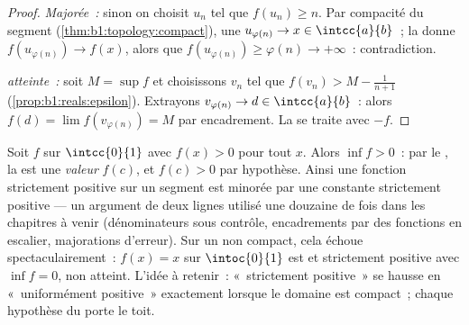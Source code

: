 \begin{proof}
\emph{Majorée~:} sinon on choisit $u_n$ tel que $f(u_n) \geq n$. Par
compacité du segment (\cref{thm:b1:topology:compact}), une  $u_{\varphi(n)} \to x \in \intcc{a}{b}$~; la  donne
$f(u_{\varphi(n)}) \to f(x)$, alors que $f(u_{\varphi(n)}) \geq
\varphi(n) \to +\infty$~: contradiction.

\emph{ atteinte~:} soit $M = \sup f$ et choisissons
$v_n$ tel que $f(v_n) > M - \frac{1}{n+1}$
(\cref{prop:b1:reals:epsilon}). Extrayons $v_{\varphi(n)} \to d \in
\intcc{a}{b}$~: alors $f(d) = \lim f(v_{\varphi(n)}) = M$ par
encadrement. La  se traite avec $-f$.
\end{proof}

\begin{example}\label{ex:b1:continuity:posmin}
Soit $f$  sur $\intcc{0}{1}$ avec $f(x) > 0$ pour tout
$x$. Alors $\inf f > 0$~: par le ,
la  est une \emph{valeur} $f(c)$, et $f(c) > 0$
par hypothèse. Ainsi une fonction  strictement positive
sur un segment est minorée par une constante strictement
positive --- un argument de deux lignes utilisé une douzaine de
fois dans les chapitres à venir (dénominateurs sous contrôle,
encadrements par des fonctions en escalier, majorations
d'erreur). Sur un  non compact, cela échoue
spectaculairement~: $f(x) = x$ sur $\intoc{0}{1}$ est  et
strictement positive avec $\inf f = 0$, non atteint. L'idée à
retenir~: «~strictement positive~» se hausse en «~uniformément
positive~» exactement lorsque le domaine est compact~; chaque
hypothèse du  porte le toit.
\end{example}


